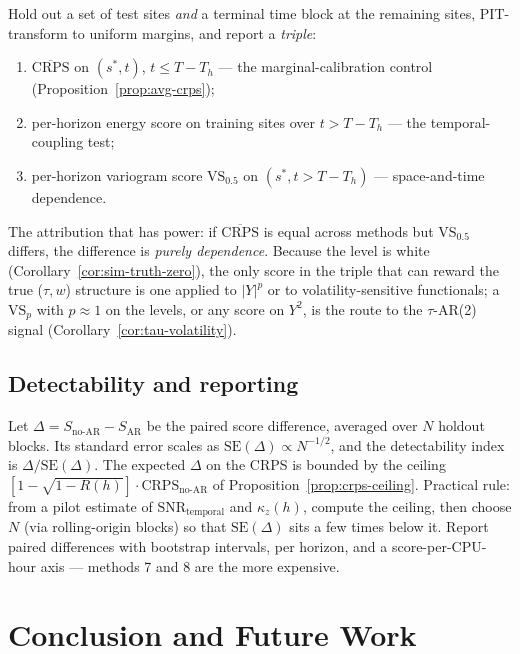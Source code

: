 \documentclass[11pt]{article}
\theoremstyle{definition}
\newcommand{\SNR}{\mathrm{SNR}_{\mathrm{temporal}}}
\begin{document}
Hold out a set of test sites \emph{and} a terminal time block at the
remaining sites, PIT-transform to uniform margins, and report a
\emph{triple}:
\begin{enumerate}[leftmargin=2em, itemsep=0pt]
  \item $\overline{\mathrm{CRPS}}$ on $(s^*,t)$, $t\le T-T_h$ --- the
        marginal-calibration control (Proposition~\ref{prop:avg-crps});
  \item per-horizon energy score on training sites over
        $t>T-T_h$ --- the temporal-coupling test;
  \item per-horizon variogram score $\mathrm{VS}_{0.5}$ on
        $(s^*,t>T-T_h)$ --- space-and-time dependence.
\end{enumerate}
The attribution that has power: if $\overline{\mathrm{CRPS}}$ is equal
across methods but $\mathrm{VS}_{0.5}$ differs, the difference is
\emph{purely dependence}. Because the level is white
(Corollary~\ref{cor:sim-truth-zero}), the only score in the triple
that can reward the true ($\tau,w$) structure is one applied to
$|Y|^p$ or to volatility-sensitive functionals; a
$\mathrm{VS}_{p}$ with $p\approx1$ on the levels, or any score on
$Y^2$, is the route to the $\tau$-AR(2) signal
(Corollary~\ref{cor:tau-volatility}).

\subsection{Detectability and reporting}
\label{subsec:detectability}

Let $\Delta = S_{\text{no-AR}} - S_{\text{AR}}$ be the paired score
difference, averaged over $N$ holdout blocks. Its standard error
scales as $\mathrm{SE}(\Delta)\propto N^{-1/2}$, and the detectability
index is $\Delta/\mathrm{SE}(\Delta)$. The expected $\Delta$ on the
CRPS is bounded by the ceiling
$[1-\sqrt{1-R(h)}]\cdot\mathrm{CRPS}_{\text{no-AR}}$ of
Proposition~\ref{prop:crps-ceiling}. Practical rule: from a pilot
estimate of $\SNR$ and $\kappa_z(h)$, compute the ceiling, then choose
$N$ (via rolling-origin blocks) so that $\mathrm{SE}(\Delta)$ sits a
few times below it. Report paired differences with bootstrap
intervals, per horizon, and a score-per-CPU-hour axis --- methods 7
and 8 are the more expensive.

\section{Conclusion and Future Work}
\label{sec:conclusion}
\end{document}
